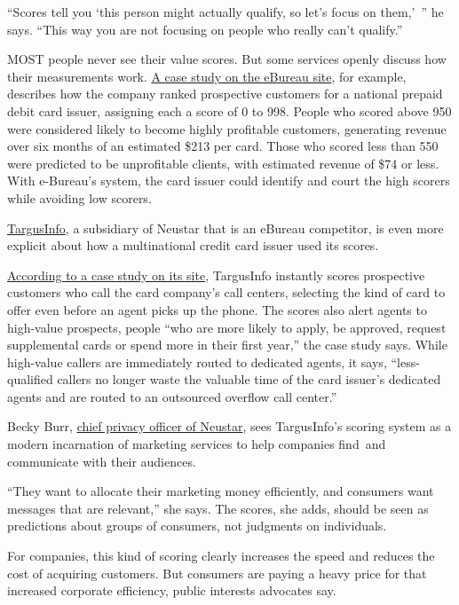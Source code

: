 ``Scores tell you `this person might actually qualify, so let's focus on
them,'~'' he says. ``This way you are not focusing on people who really
can't qualify.''

MOST people never see their value scores. But some services openly
discuss how their measurements work.
\href{http://www.ebureau.com/sites/default/files/file/ebureau_prepaid_debtcard_provider.pdf}{A
case study on the eBureau site}, for example, describes how the company
ranked prospective customers for a national prepaid debit card issuer,
assigning each a score of 0 to 998. People who scored above 950 were
considered likely to become highly profitable customers, generating
revenue over six months of an estimated \$213 per card. Those who scored
less than 550 were predicted to be unprofitable clients, with estimated
revenue of \$74 or less. With e-Bureau's system, the card issuer could
identify and court the high scorers while avoiding low scorers.

\href{http://www.targusinfo.com/}{TargusInfo}, a subsidiary of Neustar
that is an eBureau competitor, is even more explicit about how a
multinational credit card issuer used its scores.

\href{http://www.targusinfo.com/files/PDF/case_studies/CreditCardIssuer.pdf}{According
to a case study on its site}, TargusInfo instantly scores prospective
customers who call the card company's call centers, selecting the kind
of card to offer even before an agent picks up the phone. The scores
also alert agents to high-value prospects, people ``who are more likely
to apply, be approved, request supplemental cards or spend more in their
first year,'' the case study says. While high-value callers are
immediately routed to dedicated agents, it says, ``less-qualified
callers no longer waste the valuable time of the card issuer's dedicated
agents and are routed to an outsourced overflow call center.''

Becky Burr,
\href{http://www.targusinfo.com/solutions/adadvisor/how-it-works/privacy-by-design/}{chief
privacy officer of Neustar}, sees TargusInfo's scoring system as a
modern incarnation of marketing services to help companies find~and
communicate with their audiences.

``They want to allocate their marketing money efficiently, and consumers
want messages that are relevant,'' she says. The scores, she adds,
should be seen as predictions about groups of consumers, not judgments
on individuals.

For companies, this kind of scoring clearly increases the speed and
reduces the cost of acquiring customers. But consumers are paying a
heavy price for that increased corporate efficiency, public interests
advocates say.

